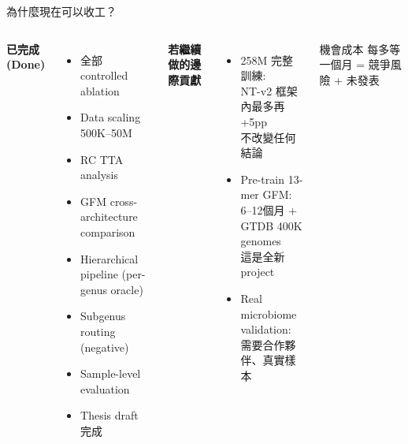 \documentclass[aspectratio=169,12pt]{beamer}
\begin{document}
\begin{frame}{為什麼現在可以收工？}
\begin{columns}
\textbf{已完成 (Done)}
\begin{itemize}
  \item[$\checkmark$] 全部 controlled ablation
  \item[$\checkmark$] Data scaling 500K–50M
  \item[$\checkmark$] RC TTA analysis
  \item[$\checkmark$] GFM cross-architecture comparison
  \item[$\checkmark$] Hierarchical pipeline (per-genus oracle)
  \item[$\checkmark$] Subgenus routing (negative)
  \item[$\checkmark$] Sample-level evaluation
  \item[$\checkmark$] Thesis draft 完成
\end{itemize}

\textbf{若繼續做的邊際貢獻}
\begin{itemize}
  \item[$\to$] 258M 完整訓練:\\NT-v2 框架內最多再+5pp\\不改變任何結論
  \item[$\to$] Pre-train 13-mer GFM:\\6–12個月 + GTDB 400K genomes\\這是全新 project
  \item[$\to$] Real microbiome validation:\\需要合作夥伴、真實樣本
\end{itemize}

\vspace{6pt}
\begin{alertblock}{機會成本}
每多等一個月 = 競爭風險 + 未發表
\end{alertblock}
\end{columns}
\end{frame}
\end{document}
